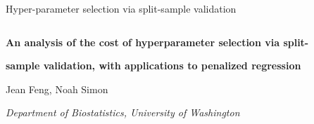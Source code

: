 \documentclass[12pt]{article} %
\theoremstyle{definition}
\begin{document}

\renewcommand{\baselinestretch}{2}


{\hfill {\footnotesize\rm Hyper-parameter selection via split-sample validation} \hfill}

\renewcommand{\thefootnote}{}
$\ $\par


\fontsize{12}{14pt plus.8pt minus .6pt}\selectfont \vspace{0.8pc}
\centerline{\large\bf An analysis of the cost of hyperparameter selection via split-}
\vspace{2pt} \centerline{\large\bf sample validation, with applications to penalized regression}
\vspace{.4cm} \centerline{Jean Feng, Noah Simon} \vspace{.4cm} \centerline{\it
Department of Biostatistics, University of Washington} \vspace{.55cm} \fontsize{9}{11.5pt plus.8pt minus
.6pt}\selectfont

\end{document}
